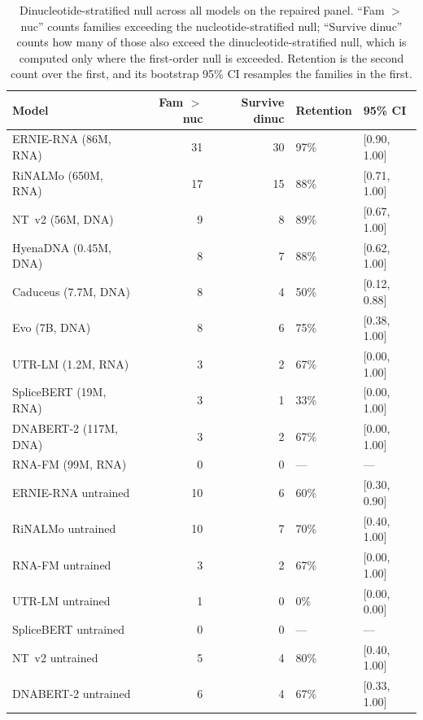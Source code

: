 \begin{table}[htbp]
\centering
\caption{Dinucleotide-stratified null across all models on the repaired panel.
``Fam $>$ nuc'' counts families exceeding the nucleotide-stratified null;
``Survive dinuc'' counts how many of those also exceed the
dinucleotide-stratified null, which is computed only where the first-order null
is exceeded. Retention is the second count over the first, and its bootstrap
95\% CI resamples the families in the first.}
\label{tab:rung2}
\small
\begin{tabular}{lrrll}
\toprule
\textbf{Model} & \textbf{Fam $>$ nuc} & \textbf{Survive dinuc} & \textbf{Retention} & \textbf{95\% CI} \\
\midrule
ERNIE-RNA (86M, RNA)       & 31 & 30 & 97\% & [0.90, 1.00] \\
RiNALMo (650M, RNA)        & 17 & 15 & 88\% & [0.71, 1.00] \\
NT~v2 (56M, DNA)           & 9 & 8 & 89\% & [0.67, 1.00] \\
HyenaDNA (0.45M, DNA)      & 8 & 7 & 88\% & [0.62, 1.00] \\
Caduceus (7.7M, DNA)       & 8 & 4 & 50\% & [0.12, 0.88] \\
Evo (7B, DNA)              & 8 & 6 & 75\% & [0.38, 1.00] \\
UTR-LM (1.2M, RNA)         & 3 & 2 & 67\% & [0.00, 1.00] \\
SpliceBERT (19M, RNA)      & 3 & 1 & 33\% & [0.00, 1.00] \\
DNABERT-2 (117M, DNA)      & 3 & 2 & 67\% & [0.00, 1.00] \\
RNA-FM (99M, RNA)          & 0 & 0 & --- & --- \\
\midrule
ERNIE-RNA untrained        & 10 & 6 & 60\% & [0.30, 0.90] \\
RiNALMo untrained          & 10 & 7 & 70\% & [0.40, 1.00] \\
RNA-FM untrained           & 3 & 2 & 67\% & [0.00, 1.00] \\
UTR-LM untrained           & 1 & 0 & 0\% & [0.00, 0.00] \\
SpliceBERT untrained       & 0 & 0 & --- & --- \\
NT~v2 untrained            & 5 & 4 & 80\% & [0.40, 1.00] \\
DNABERT-2 untrained        & 6 & 4 & 67\% & [0.33, 1.00] \\
\bottomrule
\end{tabular}
\end{table}
